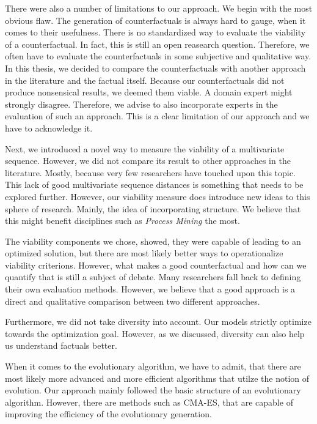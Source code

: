 \documentclass[./../../paper.tex]{subfiles}
\begin{document}
There were also a number of limitations to our approach. We begin with the most obvious flaw. The generation of counterfactuals is always hard to gauge, when it comes to their usefulness. There is no standardized way to evaluate the viability of a counterfactual. In fact, this is still an open reasearch question\autocites{hsieh_DiCE4ELInterpretingProcess_2021,mothilal_ExplainingMachineLearning_2020}. Therefore, we often have to evaluate the counterfactuals in some subjective and qualitative way. In this thesis, we decided to compare the counterfactuals with another approach in the literature and the factual itself. Because our counterfactuals did not produce nonsensical results, we deemed them viable. A domain expert might strongly disagree. Therefore, we advise to also incorporate experts in the evaluation of such an approach. This is a clear limitation of our approach and we have to acknowledge it. 

Next, we introduced a novel way to measure the viability of a multivariate sequence. However, we did not compare its result to other approaches in the literature. Mostly, because very few researchers have touched upon this topic. This lack of good multivariate sequence distances is something that needs to be explored further. However, our viability measure does introduce new ideas to this sphere of research. Mainly, the idea of incorporating structure. We believe that this might benefit disciplines such as \emph{Process Mining} the most. 

The viability components we chose, showed, they were capable of leading to an optimized solution, but there are most likely better ways to operationalize viability criterions. However, what makes a good counterfactual and how can we quantify that is still a subject of debate. Many researchers fall back to defining their own evaluation methods. However, we believe that a good approach is a direct and qualitative comparison between two different approaches.

Furthermore, we did not take diversity into account. Our models strictly optimize towards the optimization goal. However, as we discussed, diversity can also help us understand factuals better.

When it comes to the evolutionary algorithm, we have to admit, that there are most likely more advanced and more efficient algorithms that utilze the notion of evolution. Our approach mainly followed the basic structure of an evolutionary algorithm. However, there are methods such as CMA-ES, that are capable of improving the efficiency of the evolutionary generation. 
\end{document}
